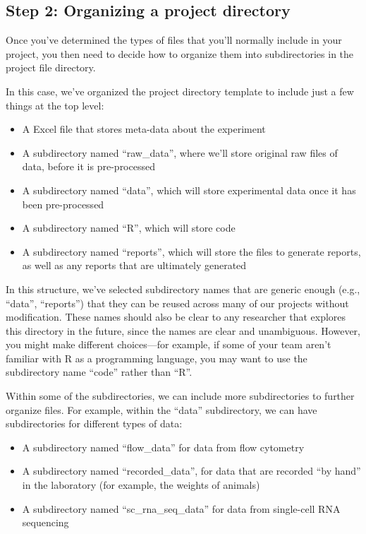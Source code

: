 \documentclass[]{tufte-book}
\providecommand{\tightlist}{%
  \setlength{\itemsep}{0pt}\setlength{\parskip}{0pt}}
\begin{document}
\subsection{Step 2: Organizing a project directory}\label{step-2-organizing-a-project-directory}

Once you've determined the types of files that you'll normally include in your
project, you then need to decide how to organize them into subdirectories in the project
file directory.

In this case, we've organized the project directory template to include just
a few things at the top level:

\begin{itemize}
\tightlist
\item
  A Excel file that stores meta-data about the experiment
\item
  A subdirectory named ``raw\_data'', where we'll store original raw files of
  data, before it is pre-processed
\item
  A subdirectory named ``data'', which will store experimental data once it
  has been pre-processed
\item
  A subdirectory named ``R'', which will store code
\item
  A subdirectory named ``reports'', which will store the files to generate
  reports, as well as any reports that are ultimately generated
\end{itemize}

In this structure, we've selected subdirectory names that are generic enough
(e.g., ``data'', ``reports'') that they can be reused across many of our projects
without modification. These names should also be clear to any researcher that
explores this directory in the future, since the names are clear and
unambiguous. However, you might make different choices---for example, if
some of your team aren't familiar with R as a programming language, you may
want to use the subdirectory name ``code'' rather than ``R''.

Within some of the subdirectories, we can include more subdirectories to
further organize files. For example, within the ``data'' subdirectory, we can
have subdirectories for different types of data:

\begin{itemize}
\tightlist
\item
  A subdirectory named ``flow\_data'' for data from flow cytometry
\item
  A subdirectory named ``recorded\_data'', for data that are recorded ``by hand''
  in the laboratory (for example, the weights of animals)
\item
  A subdirectory named ``sc\_rna\_seq\_data'' for data from single-cell RNA
  sequencing
\end{itemize}
\end{document}
